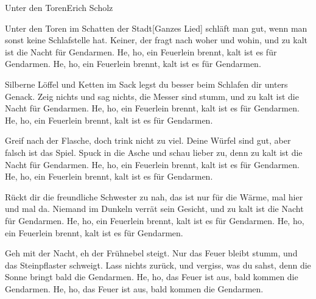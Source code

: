 \begin{song}{Unter den Toren}{Erich Scholz}{}

Unter den Toren im Schatten der Stadt[Ganzes Lied]
schläft man gut, wenn man sonst keine Schlafstelle hat.
Keiner, der fragt nach woher und wohin,
und zu kalt ist die Nacht für Gendarmen.
He, ho, ein Feuerlein brennt, kalt ist es für Gendarmen.
He, ho, ein Feuerlein brennt, kalt ist es für Gendarmen.

Silberne Löffel und Ketten im Sack
legst du besser beim Schlafen dir unters Genack.
Zeig nichts und sag nichts, die Messer sind stumm,
und zu kalt ist die Nacht für Gendarmen.
He, ho, ein Feuerlein brennt, kalt ist es für Gendarmen.
He, ho, ein Feuerlein brennt, kalt ist es für Gendarmen.

Greif nach der Flasche, doch trink nicht zu viel.
Deine Würfel sind gut, aber falsch ist das Spiel.
Spuck in die Asche und schau lieber zu,
denn zu kalt ist die Nacht für Gendarmen.
He, ho, ein Feuerlein brennt, kalt ist es für Gendarmen.
He, ho, ein Feuerlein brennt, kalt ist es für Gendarmen.

Rückt dir die freundliche Schwester zu nah,
das ist nur für die Wärme, mal hier und mal da.
Niemand im Dunkeln verrät sein Gesicht,
\newpage
{}
und zu kalt ist die Nacht für Gendarmen.
He, ho, ein Feuerlein brennt, kalt ist es für Gendarmen.
He, ho, ein Feuerlein brennt, kalt ist es für Gendarmen.

Geh mit der Nacht, eh der Frühnebel steigt.
Nur das Feuer bleibt stumm, und das Steinpflaster schweigt.
Lass nichts zurück, und vergiss, was du sahst,
denn die Sonne bringt bald die Gendarmen.
He, ho, das Feuer ist aus, bald kommen die Gendarmen.
He, ho, das Feuer ist aus, bald kommen die Gendarmen.

\end{song}
